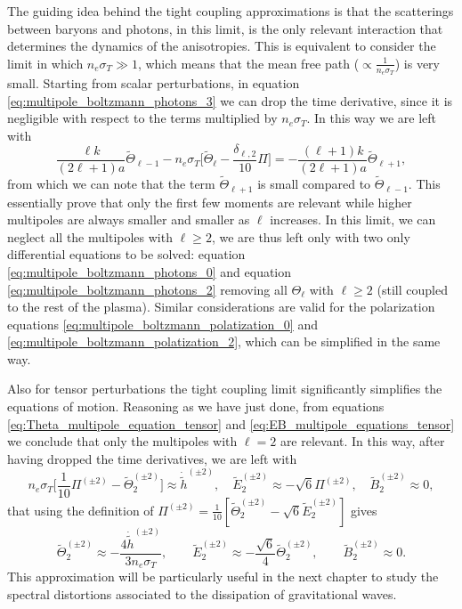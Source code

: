 The guiding idea behind the tight coupling approximations is that the scatterings between baryons and photons, in this limit, is the only relevant interaction that determines the dynamics of the anisotropies. This is equivalent to consider the limit in which $n_e\sigma_T\gg1$, which means that the mean free path ($\propto\frac{1}{n_e\sigma_T}$) is very small. Starting from scalar perturbations, in equation \eqref{eq:multipole_boltzmann_photons_3} we can drop the time derivative, since it is negligible with respect to the terms multiplied by $n_e\sigma_T$. In this way we are left with
$$\frac{\ell k}{(2\ell+1)a}\tilde\Theta_{\ell-1}-n_e\sigma_T\bigg[\tilde\Theta_\ell-\frac{\delta_{\ell,2}}{10}\Pi\bigg]=-\frac{(\ell+1)k}{(2\ell+1)a}\tilde\Theta_{\ell+1},$$
from which we can note that the term $\tilde\Theta_{\ell+1}$ is small compared to $\tilde\Theta_{\ell-1}$. This essentially prove that only the first few moments are relevant while higher multipoles are always smaller and smaller as $\ell$ increases. In this limit, we can neglect all the multipoles with $\ell\geq2$, we are thus left only with two only differential equations to be solved: equation \eqref{eq:multipole_boltzmann_photons_0} and equation \eqref{eq:multipole_boltzmann_photons_2} removing all $\Theta_\ell$ with $\ell\geq2$ (still coupled to the rest of the plasma). Similar considerations are valid for the polarization equations \eqref{eq:multipole_boltzmann_polatization_0} and \eqref{eq:multipole_boltzmann_polatization_2}, which can be simplified in the same way.

Also for tensor perturbations the tight coupling limit significantly simplifies the equations of motion. Reasoning as we have just done, from equations \eqref{eq:Theta_multipole_equation_tensor} and \eqref{eq:EB_multipole_equations_tensor} we conclude that only the multipoles with $\ell=2$ are relevant. In this way, after having dropped the time derivatives, we are left with 
$$n_e\sigma_T\bigg[\frac{1}{10}\Pi^{(\pm2)}-\tilde\Theta_2^{(\pm2)}\bigg]\approx\dot{\tilde h}^{(\pm2)},\quad\tilde E_2^{(\pm2)}\approx-\sqrt{6}\Pi^{(\pm2)},\quad\tilde B_{2}^{(\pm2)}\approx0,$$
that using the definition of $\Pi^{(\pm2)}=\frac{1}{10}[\tilde\Theta_{2}^{(\pm2)}-\sqrt 6 \tilde E_{2}^{(\pm2)}]$ gives
\begin{equation}
    \label{eq:TightCouplingTensor}
    \tilde\Theta_2^{(\pm2)}\approx-\frac{4\dot{\tilde h}^{(\pm2)}}{3n_e\sigma_T},\qquad\tilde E_2^{(\pm2)}\approx-\frac{\sqrt{6}}{4}\tilde\Theta_2^{(\pm2)},\qquad\tilde B_{2}^{(\pm2)}\approx0.
\end{equation}
This approximation will be particularly useful in the next chapter to study the spectral distortions associated to the dissipation of gravitational waves.

